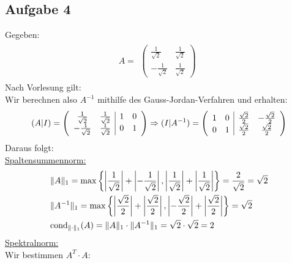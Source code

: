 \subsection*{Aufgabe 4}
Gegeben:
\begin{align*} \label{eq8}
A=
\begin{split}
\begin{pmatrix}
\frac{1}{\sqrt2} & \frac{1}{\sqrt2} \\
-\frac{1}{\sqrt2} &\frac{1}{\sqrt2}
\end{pmatrix}
\end{split}
\end{align*}
Nach Vorlesung gilt: \\

Wir berechnen also $A^{-1}$ mithilfe des Gauss-Jordan-Verfahren und erhalten:
\begin{align*}
(A|I)=
\begin{split}
\begin{array}({cc|cc})
\frac{1}{\sqrt2} & \frac{1}{\sqrt2} & 1 & 0 \\
-\frac{1}{\sqrt2} &\frac{1}{\sqrt2} & 0 & 1
\end{array}
\Rightarrow(I|A^{-1})=
\begin{array}({cc|cc})
 1 & 0 & \frac{\sqrt2}{2} & -\frac{\sqrt2}{2} \\
 0 & 1 & \frac{\sqrt2}{2} & \frac{\sqrt2}{2}
\end{array}
\end{split}
\end{align*}
Daraus folgt:\\
\underline{Spaltensummennorm:}
\begin{align*}
\begin{split}
&\|A\|_1=\mathrm{max}\left\lbrace \left|\frac{1}{\sqrt2}\right|+\left|-\frac{1}{\sqrt2}\right|, \left|\frac{1}{\sqrt2}\right|+\left|\frac{1}{\sqrt2}\right|\right\rbrace=\frac{2}{\sqrt{2}} = \sqrt{2} \\
&\|A^{-1}\|_1=\mathrm{max}\left\lbrace\left|\frac{\sqrt2}{2}\right|+\left|\frac{\sqrt2}{2}\right|, \left|-\frac{\sqrt2}{2}\right|+\left|\frac{\sqrt2}{2}\right|\right\rbrace={\sqrt2}\\
& \mathrm{cond}_{\| \cdot \|_1}(A)=\|A\|_1\cdot\|A^{-1}\|_1={\sqrt{2}} \cdot  {\sqrt{2}}  = 2\\
\end{split}
\end{align*}
\underline{Spektralnorm:}\\
Wir bestimmen $A^T\cdot A$:\\
